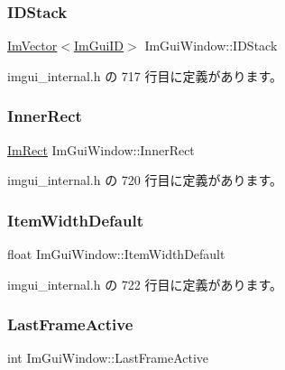 \subsubsection{\texorpdfstring{I\+D\+Stack}{IDStack}}
{\footnotesize\ttfamily \mbox{\hyperlink{class_im_vector}{Im\+Vector}}$<$\mbox{\hyperlink{imgui_8h_a1785c9b6f4e16406764a85f32582236f}{Im\+Gui\+ID}}$>$ Im\+Gui\+Window\+::\+I\+D\+Stack}



 imgui\+\_\+internal.\+h の 717 行目に定義があります。

\mbox{\label{struct_im_gui_window_a0fd27908ebffb5d9509dc9e7f199d67d}} 
\subsubsection{\texorpdfstring{Inner\+Rect}{InnerRect}}
{\footnotesize\ttfamily \mbox{\hyperlink{struct_im_rect}{Im\+Rect}} Im\+Gui\+Window\+::\+Inner\+Rect}



 imgui\+\_\+internal.\+h の 720 行目に定義があります。

\mbox{\label{struct_im_gui_window_a5e6be361ee0c71a22a1ff68f6dbf09ff}} 
\subsubsection{\texorpdfstring{Item\+Width\+Default}{ItemWidthDefault}}
{\footnotesize\ttfamily float Im\+Gui\+Window\+::\+Item\+Width\+Default}



 imgui\+\_\+internal.\+h の 722 行目に定義があります。

\mbox{\label{struct_im_gui_window_a6f3c194efabb4fd0a99be45fa5fe26f1}} 
\subsubsection{\texorpdfstring{Last\+Frame\+Active}{LastFrameActive}}
{\footnotesize\ttfamily int Im\+Gui\+Window\+::\+Last\+Frame\+Active}



